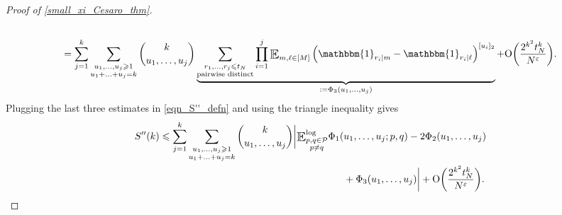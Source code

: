 \documentclass[letter,11pt]{article}
\theoremstyle{plain} %
\theoremstyle{definition} %
\theoremstyle{plain}
\theoremstyle{plain}
\theoremstyle{plain}
\numberwithin{equation}{section}
\newcommand{\Oh}{{\mathrm O}}
\renewcommand{\epsilon}{\varepsilon}
\renewcommand{\leq}{\leqslant}
\renewcommand{\geq}{\geqslant}
\newcommand{\E}{\raisebox{-0.4ex}{\scalebox{1.4}[1.3]{$\mathbb{E}$}}}
\newcommand{\Esub}[1]{\raisebox{-0.4ex}{\scalebox{1.4}[1.3]{$\mathbb{E}$}}\raisebox{-0.35ex}{\ensuremath{_{\scriptstyle #1}}}}
\newcommand{\logE}{{\E}^{\log}}
\newcommand{\1}{\mathbbm{1}}
\newcommand{\Pc}{\mathcal{P}}
\begin{document}
\begin{proof}[Proof of \cref{small_xi_Cesaro_thm}]
\begin{multline*}
\\
=
\sum_{j=1}^k\sum_{\substack{u_1,\ldots,u_j\geq 1 \\ u_1+\ldots+u_j=k}} \binom{k}{u_1,\ldots,u_j} \underbrace{\sum_{\substack{r_1,\ldots,r_j\leq t_N \\ \text{pairwise distinct}}}\prod_{i=1}^j \Esub{m,\ell\in[M]}  
\left(\1_{r_i\mid m}-\1_{r_i\mid \ell}\right)^{[u_i]_2}}_{:=\Phi_3(u_1,\ldots,u_j)} + \Oh\bigg(\frac{2^{k^2}t_N^k}{N^\epsilon}\bigg).
\end{multline*}
Plugging the last three estimates in \eqref{eqn_S''_defn} and using the triangle inequality gives 
\begin{align}\label{eqn_S''_2}
    S''(k) \leq \sum_{j=1}^k\sum_{\substack{u_1,\ldots,u_j\geq 1 \\ u_1+\ldots+u_j=k}} \binom{k}{u_1,\ldots,u_j}\bigg| \logE_{\substack{p,q\in\Pc \\ p\neq q}} \Phi_1(&u_1,\ldots,u_j;p,q) - 2\Phi_2(u_1,\ldots,u_j) \notag \\
    & + \Phi_3(u_1,\ldots,u_j)\bigg| + \Oh\bigg(\frac{2^{k^2}t_N^k}{N^\epsilon}\bigg).
\end{align}


\end{proof}
\end{document}
